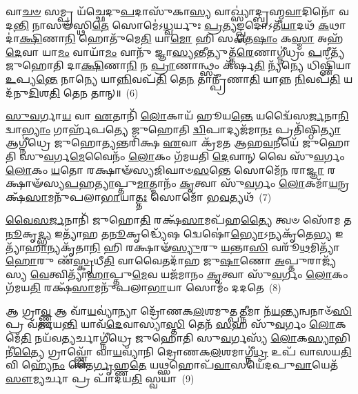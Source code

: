 𑌵𑌾\-\ul{𑌚}\-\-\ul{𑍞} 𑌸𑌮𑍍𑌪𑍍𑌰 𑌯᳴𑌚𑍍𑌛𑍇𑌦𑍁\-\ul{𑌪}\-𑌦𑌾𑌸𑍁᳴𑌕𑌾\-\ul{𑌸𑍍𑌯} 𑌵𑌾𑌖𑍍𑌸𑍍𑌯𑌾॑𑌦𑍍𑌬𑍍𑌰𑌹𑍍𑌮\-\ul{𑌵𑌾}\-𑌦𑌿𑌨𑍋᳴ 𑌵𑌦\-\ul{𑌨𑍍𑌤𑌿} 𑌨𑌾𑌸𑍟᳴𑌸𑍍𑌥𑌿\-\ul{𑌤𑍇} 𑌸𑍋𑌮𑍇॑\-𑌽\-\ul{𑌧𑍍𑌵}\-𑌰𑍍𑌯𑍁𑌃 \ul{𑌪𑍍𑌰}\-𑌤𑍍𑌯𑌙𑍍𑌖𑍍𑌸𑌦𑍋\-𑌽𑌤𑍀᳴\-\ul{𑌯𑌾}\-𑌦𑌥᳴ \ul{𑌕}\-𑌥𑌾 𑌦𑌾॑\-\ul{𑌕𑍍𑌷𑌿}\-𑌣𑌾\-\ul{𑌨𑌿} 𑌹𑍋𑌤𑍁᳴𑌮𑍇\-\ul{𑌤𑌿} 𑌯𑌾\-\ul{𑌮𑍋} 𑌹𑌿 𑌸 𑌤𑍇\-\ul{𑌷𑌾𑌂} 𑌕\-\ul{𑌸𑍍𑌮𑌾} 𑌅𑌹᳴ \ul{𑌦𑍇}\-𑌵𑌾 𑌯𑌾\-\ul{𑌮𑌂} 𑌵𑌾𑌯𑌾᳴\-\ul{𑌮𑌂} 𑌵𑌾𑌨𑍁᳴ 𑌜𑍍𑌞𑌾\-\ul{𑌸𑍍𑌯}\-𑌨𑍍𑌤𑍀𑌤𑍍𑌯𑍁𑌤𑍍𑌤᳴\-\ul{𑌰𑍇}\-𑌣𑌾𑌗𑍍𑌨𑍀॑𑌧𑍍𑌰𑌂 \ul{𑌪}\-𑌰𑍀𑌤𑍍𑌯᳴ 𑌜𑍁𑌹𑍋𑌤𑌿 𑌦𑌾\-\ul{𑌕𑍍𑌷𑌿}\-𑌣𑌾\-\ul{𑌨𑌿} 𑌨 \ul{𑌪𑍍𑌰𑌾}\-𑌣𑌾𑌨𑍍𑌥𑍍𑌸𑌂 𑌕᳴𑌰𑍍\mbox{}𑌷\-\ul{𑌤𑌿} 𑌨𑍍𑌯᳴𑌨𑍍𑌯𑍇 𑌧𑌿𑌷𑍍𑌣𑌿᳴𑌯𑌾 \ul{𑌉}\-𑌪𑍍𑌯\-\ul{𑌨𑍍𑌤𑍇} 𑌨𑌾𑌨𑍍𑌯𑍇 𑌯𑌾\-\ul{𑌨𑍍𑌨𑌿}\-𑌵𑌪᳴\-\ul{𑌤𑌿} 𑌤𑍇\-\ul{𑌨} 𑌤𑌾𑌨𑍍𑌪𑍍𑌰𑍀᳴𑌣𑌾\-\ul{𑌤𑌿} 𑌯𑌾𑌨𑍍𑌨 \ul{𑌨𑌿}\-𑌵𑌪᳴\-\ul{𑌤𑌿} 𑌯𑌦᳴𑌨𑍁\-\ul{𑌦𑌿}\-𑌶\-\ul{𑌤𑌿} 𑌤𑍇\-\ul{𑌨} 𑌤𑌾𑌨𑍍॥~(6)

{\anuvakamend[{\-\ul{𑌸𑍍𑌤𑍁}\-𑌤𑍇 \ul{𑌵𑌿}\-𑌨𑍍𑌦\-\ul{𑌤𑍇} 𑌹𑌿 𑌵𑍀᳴𑌯𑌨𑍍𑌤𑍇 \ul{𑌪𑍍𑌰}\-𑌤𑍀𑌚𑍀᳴𑌰𑍁\-\ul{𑌦𑍍𑌗𑌾}\-𑌤𑍍𑌰 \ul{𑌉}\-𑌪𑍍𑌯\-\ul{𑌨𑍍𑌤𑍇} 𑌚𑌤𑍁᳴𑌰𑍍𑌦𑌶 𑌚}]}%

\-\ul{𑌸𑍁}\-\-\ul{𑌵}\-𑌰𑍍𑌗𑌾\-\ul{𑌯} 𑌵𑌾 \ul{𑌏}\-𑌤𑌾𑌨𑌿᳴ \ul{𑌲𑍋}\-𑌕𑌾𑌯᳴ 𑌹𑍂𑌯\-\ul{𑌨𑍍𑌤𑍇} 𑌯𑌦𑍍𑌵𑍈᳴𑌸\-\ul{𑌰𑍍𑌜}\-𑌨𑌾\-\ul{𑌨𑌿} 𑌦𑍍𑌵𑌾\-\ul{𑌭𑍍𑌯𑌾𑌂} 𑌗𑌾𑌰𑍍\mbox{}𑌹᳴𑌪𑌤𑍍𑌯𑍇 𑌜𑍁𑌹𑍋𑌤𑌿 \ul{𑌦𑍍𑌵𑌿}\-𑌪𑌾𑌦𑍍𑌯𑌜᳴𑌮𑌾\-\ul{𑌨𑌃} 𑌪𑍍𑌰𑌤𑌿᳴𑌷𑍍𑌠𑌿\-\ul{𑌤𑍍𑌯𑌾} 𑌆𑌗𑍍𑌨𑍀॑𑌧𑍍𑌰𑍇 𑌜𑍁𑌹𑍋\-\ul{𑌤𑍍𑌯}\-𑌨𑍍𑌤𑌰𑌿᳴𑌕𑍍𑌷 \ul{𑌏}\-𑌵𑌾 𑌕𑍍𑌰᳴𑌮𑌤 𑌆𑌹\-\ul{𑌵}\-𑌨𑍀𑌯𑍇᳴ 𑌜𑍁𑌹𑍋𑌤𑌿 𑌸𑍁\-\ul{𑌵}\-𑌰𑍍𑌗\-\ul{𑌮𑍇}\-𑌵𑍈𑌨𑌂᳴ \ul{𑌲𑍋}\-𑌕𑌂 𑌗᳴𑌮𑌯𑌤𑌿 \ul{𑌦𑍇}\-𑌵𑌾𑌨𑍍 𑌵𑍈 𑌸𑍁᳴\-\ul{𑌵}\-𑌰𑍍𑌗𑌂 \ul{𑌲𑍋}\-𑌕𑌂 \ul{𑌯}\-𑌤𑍋 𑌰𑌕𑍍𑌷𑌾𑍟᳴𑌸𑍍𑌯𑌜𑌿𑌘𑌾𑍞\-\ul{𑌸}\-𑌨𑍍𑌤𑍇 𑌸𑍋𑌮𑍇᳴\-\ul{𑌨} 𑌰𑌾\-\ul{𑌜𑍍𑌞𑌾} 𑌰𑌕𑍍𑌷𑌾𑍟᳴𑌸𑍍𑌯\-\ul{𑌪}\-𑌹\-\ul{𑌤𑍍𑌯𑌾}\-𑌪𑍍𑌤𑍁\-\ul{𑌮𑌾}\-𑌤𑍍𑌮𑌾𑌨𑌂᳴ \ul{𑌕𑍃}\-𑌤𑍍𑌵𑌾 𑌸𑍁᳴\-\ul{𑌵}\-𑌰𑍍𑌗𑌂 \ul{𑌲𑍋}\-𑌕𑌮𑌾᳴\-\ul{𑌯}\-𑌨𑍍𑌰𑌕𑍍𑌷᳴\-\ul{𑌸𑌾}\-𑌮𑌨𑍁᳴𑌪𑌲𑌾\-\ul{𑌭𑌾}\-𑌯𑌾\-\ul{𑌤𑍍𑌤𑌃} 𑌸𑍋𑌮𑍋᳴ 𑌭\-\ul{𑌵}\-𑌤𑍍𑌯𑌥᳴~(7)

\-\ul{𑌵𑍈}\-\-\ul{𑌸}\-\-\ul{𑌰𑍍𑌜}\-𑌨𑌾𑌨𑌿᳴ 𑌜𑍁𑌹𑍋\-\ul{𑌤𑌿} 𑌰𑌕𑍍𑌷᳴\-\ul{𑌸𑌾}\-𑌮𑌪᳴𑌹\-\ul{𑌤𑍍𑌯𑍈} 𑌤𑍍𑌵𑍞 𑌸𑍋᳴𑌮 𑌤\-\ul{𑌨𑍂}\-𑌕𑍃\-\ul{𑌦𑍍𑌭𑍍𑌯} 𑌇𑌤𑍍𑌯𑌾᳴𑌹 𑌤\-\ul{𑌨𑍂}\-𑌕𑍃𑌦𑍍𑌧𑍍𑌯𑍇᳴𑌷 𑌦𑍍𑌵𑍇𑌷𑍋॑\-\ul{𑌭𑍍𑌯𑍋}\-\-𑌽𑌨𑍍𑌯𑌕𑍃᳴𑌤𑍇\-\ul{𑌭𑍍𑌯} 𑌇𑌤𑍍𑌯𑌾᳴\-\ul{𑌹𑌾}\-𑌨𑍍𑌯𑌕𑍃᳴𑌤𑌾\-\ul{𑌨𑌿} 𑌹𑌿 𑌰𑌕𑍍𑌷𑌾𑍟᳴\-\ul{𑌸𑍍𑌯𑍁}\-𑌰𑍁 \ul{𑌯}\-𑌨𑍍𑌤𑌾\-\ul{𑌸𑌿} 𑌵𑌰𑍂᳴\-\ul{𑌥}\-𑌮𑌿𑌤𑍍𑌯𑌾᳴\-\ul{𑌹𑍋}\-𑌰𑍁 𑌣᳴\-\ul{𑌸𑍍𑌕𑍃}\-𑌧𑍀\-\ul{𑌤𑌿} 𑌵𑌾𑌵𑍈𑌤𑌦𑌾᳴𑌹 𑌜𑍁\-\ul{𑌷𑌾}\-𑌣𑍋 \ul{𑌅}\-𑌪𑍍𑌤𑍁𑌰𑌾𑌜𑍍𑌯᳴𑌸𑍍𑌯 \ul{𑌵𑍇}\-𑌤𑍍𑌵𑌿𑌤𑍍𑌯𑌾᳴\-\ul{𑌹𑌾}\-𑌪𑍍𑌤𑍁\-\ul{𑌮𑍇}\-𑌵 𑌯𑌜᳴𑌮𑌾𑌨𑌂 \ul{𑌕𑍃}\-𑌤𑍍𑌵𑌾 𑌸𑍁᳴\-\ul{𑌵}\-𑌰𑍍𑌗𑌂 \ul{𑌲𑍋}\-𑌕𑌂 𑌗᳴𑌮𑌯\-\ul{𑌤𑌿} 𑌰𑌕𑍍𑌷᳴\-\ul{𑌸𑌾}\-𑌮𑌨𑍁᳴𑌪𑌲𑌾\-\ul{𑌭𑌾}\-𑌯𑌾 𑌸𑍋𑌮𑌂᳴ 𑌦𑌦𑌤𑍇~(8)

𑌆 𑌗𑍍𑌰𑌾\-\ul{𑌵𑍍𑌣𑍍𑌣} 𑌆 𑌵𑌾᳴\-\ul{𑌯}\-𑌵𑍍𑌯𑌾॑𑌨𑍍𑌯𑌾 𑌦𑍍𑌰𑍋᳴𑌣𑌕\-\ul{𑌲}\-𑌶𑌮𑍁𑌤𑍍𑌪\-\ul{𑌤𑍍𑌨𑍀}\-𑌮𑌾 𑌨᳴\-\ul{𑌯}\-𑌨𑍍𑌤𑍍𑌯𑌨𑍍𑌵𑌨𑌾𑍞᳴\-\ul{𑌸𑌿} 𑌪𑍍𑌰 𑌵᳴𑌰𑍍𑌤𑌯\-\ul{𑌨𑍍𑌤𑌿} 𑌯𑌾𑌵᳴\-\ul{𑌦𑍇}\-𑌵𑌾𑌸𑍍𑌯𑌾\-\ul{𑌸𑍍𑌤𑌿} 𑌤𑍇𑌨᳴ \ul{𑌸}\-𑌹 𑌸𑍁᳴\-\ul{𑌵}\-𑌰𑍍𑌗𑌂 \ul{𑌲𑍋}\-𑌕𑌮𑍇᳴\-\ul{𑌤𑌿} 𑌨𑌯᳴𑌵\-\ul{𑌤𑍍𑌯}\-𑌰𑍍𑌚𑌾𑌗𑍍𑌨𑍀॑𑌧𑍍𑌰𑍇 𑌜𑍁𑌹𑍋𑌤𑌿 𑌸𑍁\-\ul{𑌵}\-𑌰𑍍𑌗𑌸𑍍𑌯᳴ \ul{𑌲𑍋}\-𑌕\-\ul{𑌸𑍍𑌯𑌾}\-𑌭𑌿𑌨𑍀॑\-\ul{𑌤𑍍𑌯𑍈} 𑌗𑍍𑌰𑌾𑌵𑍍𑌣𑍍𑌣𑍋᳴ 𑌵𑌾\-\ul{𑌯}\-𑌵𑍍𑌯𑌾᳴𑌨𑌿 𑌦𑍍𑌰𑍋𑌣𑌕\-\ul{𑌲}\-𑌶𑌮𑌾𑌗𑍍𑌨𑍀॑\-\ul{𑌧𑍍𑌰} 𑌉𑌪᳴ 𑌵𑌾𑌸𑌯\-\ul{𑌤𑌿} 𑌵𑌿 𑌹𑍍𑌯𑍇᳴\-\ul{𑌨𑌂} 𑌤𑍈\-\ul{𑌰𑍍𑌗𑍃}\-𑌹𑍍𑌣\-\ul{𑌤𑍇} 𑌯\-\ul{𑌥𑍍𑌸}\-𑌹𑍋𑌪᳴\-\ul{𑌵𑌾}\-𑌸𑌯𑍇᳴𑌦𑌪𑍁\-\ul{𑌵𑌾}\-𑌯𑍇𑌤᳴ \ul{𑌸𑍗}\-𑌮𑍍𑌯𑌰𑍍𑌚𑌾 𑌪𑍍𑌰 𑌪𑌾᳴𑌦𑌯\-\ul{𑌤𑌿} 𑌸𑍍𑌵𑌯𑌾॑~(9)

